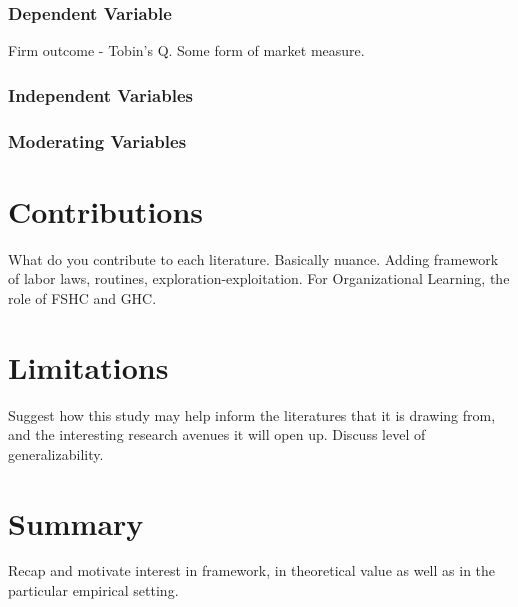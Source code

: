 \documentclass[12pt,letterpaper]{article}
\begin{document}
\subsubsection{Dependent Variable}
Firm outcome - Tobin's Q. Some form of market measure.

\subsubsection{Independent Variables}

\subsubsection{Moderating Variables}

\section{Contributions}
What do you contribute to each literature. Basically nuance. Adding framework of labor laws, routines, exploration-exploitation. For Organizational Learning, the role of FSHC and GHC.

\section{Limitations}
Suggest how this study may help inform the literatures that it is drawing from, and the interesting research avenues it will open up. Discuss level of generalizability.

\section{Summary}
Recap and motivate interest in framework, in theoretical value as well as in the particular empirical setting.


\begin{singlespace}
\renewcommand{\refname}{REFERENCES}
 

\end{singlespace}
\end{document}
